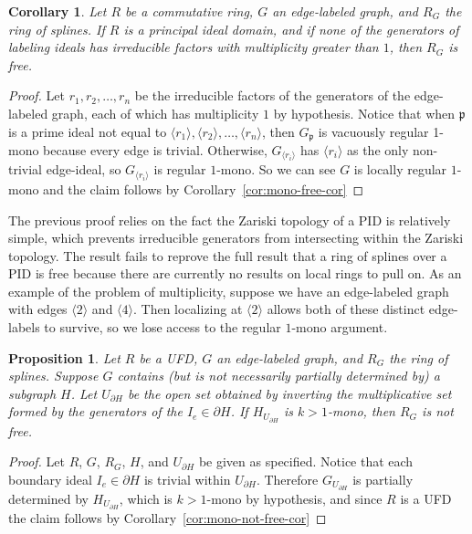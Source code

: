 \documentclass{article}
\newtheorem{corollary}{Corollary}
\newtheorem{proposition}{Proposition}
\begin{document}
\begin{corollary}
\label{cor:almost}
Let $R$ be a commutative ring, $G$ an edge-labeled graph, and $R_G$ the ring of splines. If $R$ is a principal ideal domain, and if none of the generators of labeling ideals has irreducible factors with multiplicity greater than $1$, then $R_G$ is free.
\end{corollary}
\begin{proof}
Let $r_1, r_2, \dots, r_n$ be the irreducible factors of the generators of the edge-labeled graph, each of which has multiplicity $1$ by hypothesis. Notice that when $\mathfrak p$ is a prime ideal not equal to $\langle r_1 \rangle, \langle r_2 \rangle, \dots, \langle r_n\rangle$, then $G_{\mathfrak p}$ is vacuously regular 1-mono because every edge is trivial. Otherwise, $G_{\langle r_i \rangle}$ has $\langle r_i \rangle$ as the only non-trivial edge-ideal, so $G_{\langle r_i \rangle}$ is regular $1$-mono. So we can see $G$ is locally regular $1$-mono and the claim follows by Corollary~\ref{cor:mono-free-cor}
\end{proof}

The previous proof relies on the fact the Zariski topology of a PID is relatively simple, which prevents irreducible generators from intersecting within the Zariski topology. The result fails to reprove the full result that a ring of splines over a PID is free because there are currently no results on local rings to pull on. As an example of the problem of multiplicity, suppose we have an edge-labeled graph with edges $\langle 2 \rangle$ and $\langle 4 \rangle$. Then localizing at $\langle 2 \rangle$ allows both of these distinct edge-labels to survive, so we lose access to the regular $1$-mono argument. 

\begin{proposition}
\label{prop:boundary-trivialization}
Let $R$ be a UFD, $G$ an edge-labeled graph, and $R_G$ the ring of splines. Suppose $G$ contains (but is not necessarily partially determined by) a subgraph $H$. Let $U_{\partial H}$ be the open set obtained by inverting the multiplicative set formed by the generators of the $I_e \in \partial H$. If $H_{U_{\partial H}}$ is $k>1$-mono, then $R_G$ is not free.
\end{proposition}
\begin{proof}
Let $R$, $G$, $R_G$, $H$, and $U_{\partial H}$ be given as specified. Notice that each boundary ideal $I_e \in \partial H$ is trivial within $U_{\partial H}$. Therefore $G_{U_{\partial H}}$ is partially determined by $H_{U_{\partial H}}$, which is $k>1$-mono by hypothesis, and since $R$ is a UFD the claim follows by Corollary~\ref{cor:mono-not-free-cor}
\end{proof}
\end{document}
